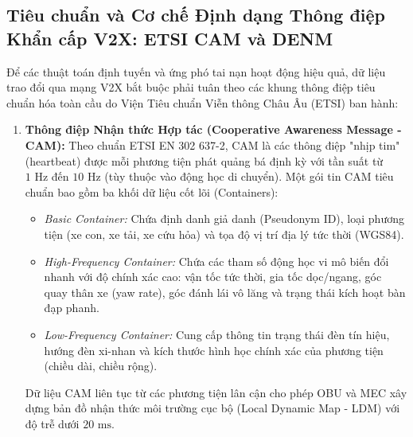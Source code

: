 \documentclass[a4paper]{article}
\begin{document}
\subsection{Tiêu chuẩn và Cơ chế Định dạng Thông điệp Khẩn cấp V2X: ETSI CAM và DENM}
Để các thuật toán định tuyến và ứng phó tai nạn hoạt động hiệu quả, dữ liệu trao đổi qua mạng V2X bắt buộc phải tuân theo các khung thông điệp tiêu chuẩn hóa toàn cầu do Viện Tiêu chuẩn Viễn thông Châu Âu (ETSI) ban hành:
\begin{enumerate}
    \item \textbf{Thông điệp Nhận thức Hợp tác (Cooperative Awareness Message - CAM):}
    Theo chuẩn ETSI EN 302 637-2, CAM là các thông điệp "nhịp tim" (heartbeat) được mỗi phương tiện phát quảng bá định kỳ với tần suất từ $1\text{ Hz}$ đến $10\text{ Hz}$ (tùy thuộc vào động học di chuyển). Một gói tin CAM tiêu chuẩn bao gồm ba khối dữ liệu cốt lõi (Containers):
    \begin{itemize}
        \item \textit{Basic Container:} Chứa định danh giả danh (Pseudonym ID), loại phương tiện (xe con, xe tải, xe cứu hỏa) và tọa độ vị trí địa lý tức thời (WGS84).
        \item \textit{High-Frequency Container:} Chứa các tham số động học vi mô biến đổi nhanh với độ chính xác cao: vận tốc tức thời, gia tốc dọc/ngang, góc quay thân xe (yaw rate), góc đánh lái vô lăng và trạng thái kích hoạt bàn đạp phanh.
        \item \textit{Low-Frequency Container:} Cung cấp thông tin trạng thái đèn tín hiệu, hướng đèn xi-nhan và kích thước hình học chính xác của phương tiện (chiều dài, chiều rộng).
    \end{itemize}
    Dữ liệu CAM liên tục từ các phương tiện lân cận cho phép OBU và MEC xây dựng bản đồ nhận thức môi trường cục bộ (Local Dynamic Map - LDM) với độ trễ dưới $20\text{ ms}$.


\end{enumerate}
\end{document}
